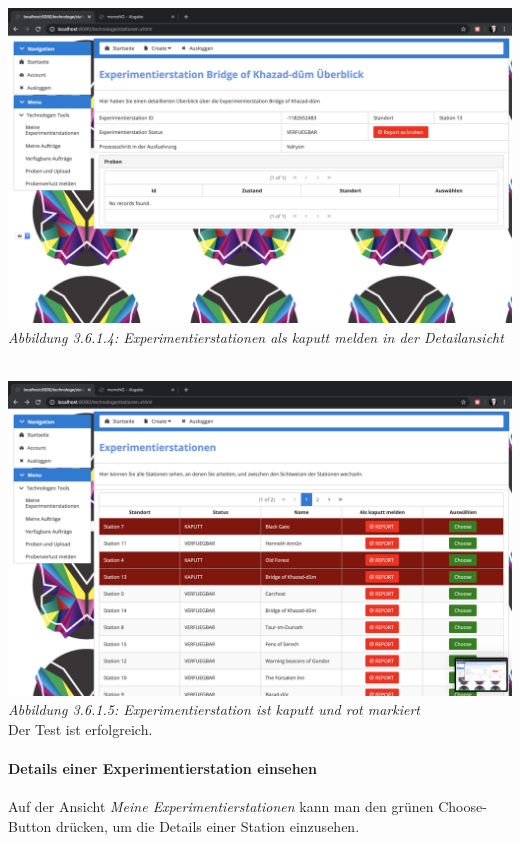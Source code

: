 \documentclass[enabledeprecatedfontcommands,fontsize=12pt,paper=a4,twoside]{scrartcl}
\begin{document}
 \hypertarget{sc3.6.1.4}{
\includegraphics[width=1\textwidth]{Screenshots/3614.png}
\textit{Abbildung 3.6.1.4: Experimentierstationen als kaputt melden in der Detailansicht}
} \\

 \hypertarget{sc3.6.1.5}{
\includegraphics[width=1\textwidth]{Screenshots/3615.png}
\textit{Abbildung 3.6.1.5: Experimentierstation ist kaputt und rot markiert}
} \\

Der Test ist erfolgreich. 

%
\paragraph{Details einer Experimentierstation einsehen}

Auf der Ansicht \textit{Meine Experimentierstationen} kann man den grünen Choose-Button drücken, um die Details einer Station einzusehen.
\end{document}
